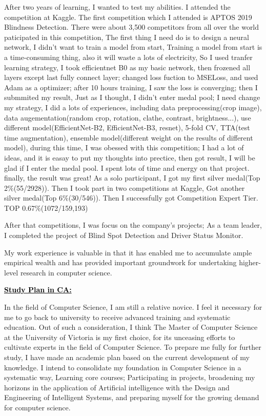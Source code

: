 \documentclass[12pt]{article}
\newcommand{\statement}[1]{\par\medskip
  \underline{\textcolor{black}{\textbf{#1:}}}\space
}
\begin{document}
\bigskip

After two years of learning, I wanted to test my abilities. I attended the competition at Kaggle. The first competition which I attended is APTOS 2019 Blindness Detection. There were about 3,500 competitors from all over the world paticipated in this competition, The first thing I need do is to design a neural network, I didn't want to train a model from start, Training a model from start is a time-consuming thing, also it will waste a lots of electricity, So I used tranfer learning strategy, I took efficientnet B0 as my basic network, then frozened all layers except last fully connect layer; changed loss fuction to MSELoss, and used Adam as a optimizer; after 10 hours training, I saw the loss is converging; then I submmited my result, Just as I thought, I didn't enter medal pool; I need change my strategy, I did a lots of experiences, including data preprocessing(crop image), data augementation(random crop, rotation, clathe, contrast, brightness...), use different model(EfficientNet-B2, EfficientNet-B3, resnet),  5-fold CV, TTA(test time augmentation), ensemble model(different weight on the results of different model), during this time, I was obessed with this competition; I had a lot of ideas, and it is easay to put my thoughts into prectice, then got result, I will be glad if I enter the medal pool. I spent lots of time and energy on that project. finally, the result was great! As a solo participant, I got my first silver medal(Top 2\%(55/2928)). Then I took part in two competitions at Kaggle, Got another silver medal(Top 6\%(30/546)). Then I successfully got Competition Expert Tier. TOP 0.67\%(1072/159,193)

\bigskip

After that competitions, I was focus on the company's projects; As a team leader, I completed the project of Blind Spot Detection and Driver Status Monitor.

\bigskip

My work experience is valuable in that it has enabled me to accumulate ample empirical wealth and has provided important groundwork for undertaking higher-level research in computer science.

\bigskip

\statement{Study Plan in CA}

In the field of Computer Science, I am still a relative novice. I feel it necessary for me to go back to university to receive advanced training and systematic education. Out of such a consideration, I think The Master of Computer Science at the University of Victoria is my first choice, for its unceasing efforts to cultivate experts in the field of Computer Science. To prepare me fully for further study, I have made an academic plan based on the current development of my knowledge. I intend to consolidate my foundation in Computer Science in a systematic way, Learning core courses; Participating in projects, broadening my horizons in the application of Artificial intelligence with the Design and Engineering of Intelligent Systems, and preparing myself for the growing demand for computer science. 
\end{document}
